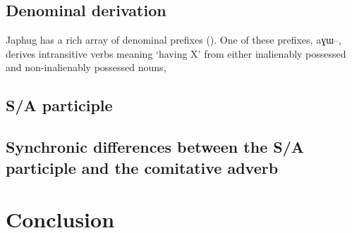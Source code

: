 \documentclass[oldfontcommands,oneside,a4paper,11pt]{article}
\newcommand{\ipa}[1]{{\phon #1}} %
\begin{document}
\subsection{Denominal derivation}
Japhug has a rich array of denominal prefixes (\citealt{jacques14antipassive}). One of these prefixes, \ipa{aɣɯ--}, derives intransitive verbs meaning `having X' from either inalienably possessed and non-inalienably possessed nouns, 

\subsection{S/A participle}
  \subsection{Synchronic differences between the S/A participle and the comitative adverb}
\section{Conclusion} 



\end{document}
